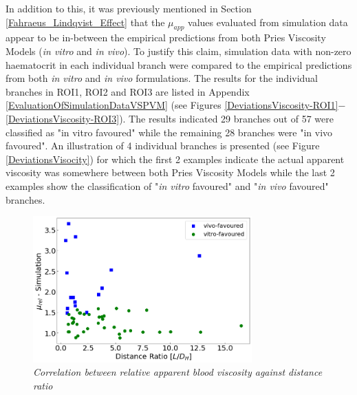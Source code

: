 \noindent In addition to this, it was previously mentioned in Section \ref{Fahraeus_Lindqvist_Effect} that the $\mu_{app}$ values evaluated from simulation data appear to be in-between the empirical predictions from both Pries Viscosity Models (\textit{in vitro} and \textit{in vivo}). To justify this claim, simulation data with non-zero haematocrit in each individual branch were compared to the empirical predictions from both \textit{in vitro} and \textit{in vivo} formulations. The results for the individual branches in ROI1, ROI2 and ROI3 are listed in Appendix \ref{EvaluationOfSimulationDataVSPVM} (see Figures \ref{DeviationsViscosity-ROI1}$-$\ref{DeviationsViscosity-ROI3}). The results indicated 29 branches out of 57 were classified as "in vitro favoured" while the remaining 28 branches were "in vivo favoured". An illustration of 4 individual branches is presented (see Figure \ref{DeviationsVisocity}) for which the first 2 examples indicate the actual apparent viscosity was somewhere between both Pries Viscosity Models while the last 2 examples show the classification of "\textit{in vitro} favoured" and "\textit{in vivo} favoured" branches. 


\begin{figure}[H]
\centering
\includegraphics[width=0.75\textwidth]{images/RelativeApparentViscosityVSDistanceRatio.png}
\caption{\textit{Correlation between relative apparent blood viscosity against distance ratio} \label{RelativeApparentViscosityVSDistanceRatio}}
\end{figure}

